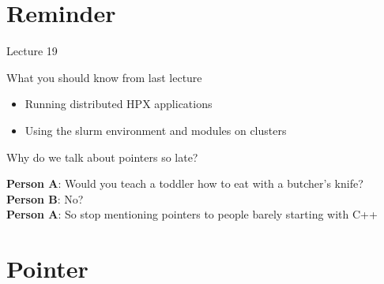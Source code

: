 \documentclass[12pt,t]{beamer}
\title{\coursename}
\subtitle{Lecture 20: Managing memory and low-level data structures}
\date {
 \tiny \url{\courseurl}
\vspace{2cm}
\doclicenseThis  
  
}
\begin{document}
 {
    \frame {
        \titlepage
    }
}

\frame{

\tableofcontents

}


\section{Reminder}
\begin{frame}{Lecture 19}
\begin{block}{What you should know from last lecture}
\begin{itemize}
\item Running distributed HPX applications
\item Using the slurm environment and modules on clusters
\end{itemize}
\end{block}
\end{frame}


\begin{frame}{Why do we talk about pointers so late?}

\textbf{Person A}: Would you teach a toddler how to eat with a butcher's knife? \\
\vspace{1cm}
\textbf{Person B}: No? \\
\vspace{1cm}
\textbf{Person A}: So stop mentioning pointers to people barely starting with C++
\end{frame}


\section{Pointer}
\end{document}
